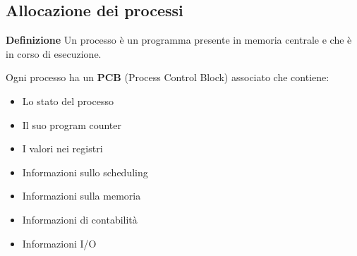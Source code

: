 \documentclass{article}
\begin{document}
\newpage

\subsection{Allocazione dei processi}

\textbf{Definizione} Un processo è un programma presente in memoria centrale e che è in corso di esecuzione.\newline

\noindent Ogni processo ha un \textbf{PCB} (Process Control Block) associato che contiene:
\begin{itemize}
    \item Lo stato del processo
    \item Il suo program counter
    \item I valori nei registri
    \item Informazioni sullo scheduling
    \item Informazioni sulla memoria
    \item Informazioni di contabilità
    \item Informazioni I/O\newline
\end{itemize}
\end{document}
